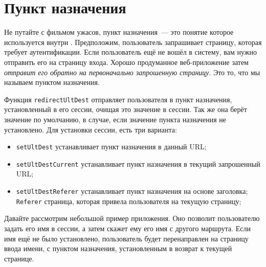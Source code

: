 \section{Пункт назначения}

Не путайте с фильмом ужасов, пункт назначения~--- это понятие которое используется внутри . Предположим, пользователь запрашивает страницу, которая требует аутентификации. Если пользователь ещё не вошёл в систему, вам нужно отправить его на страницу входа. Хорошо продуманное веб-приложение затем \emph{отправит его обратно на первоначально запрошенную страницу}. Это то, что мы называем пунктом назначения. 

Функция \lstinline'redirectUltDest' отправляет пользователя в пункт назначения, установленный в его сессии, очищая это значение в сессии. Так же она берёт значение по умолчанию, в случае, если значение пункта назначения не установлено. Для установки сессии, есть три варианта:

\begin{itemize}
  \item \lstinline'setUltDest' устанавливает пункт назначения в данный URL;
  \item \lstinline'setUltDestCurrent' устанавливает пункт назначения в текущий запрошенный URL;
  \item \lstinline'setUltDestReferer' устанавливает пункт назначения на основе заголовка; \lstinline'Referer' страница, которая привела пользователя на текущую страницу;
\end{itemize}

Давайте рассмотрим небольшой пример приложения. Оно позволит пользователю задать его имя в сессии, а затем скажет ему его имя с другого маршрута. Если имя ещё не было установлено, пользователь будет перенаправлен на страницу ввода имени, с пунктом назначения, установленным в возврат к текущей странице.

